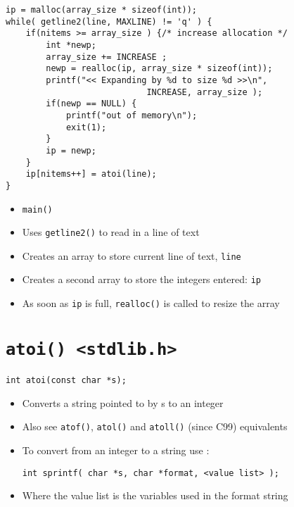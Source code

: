 \documentclass{article}
\begin{document}
\begin{verbatim}
ip = malloc(array_size * sizeof(int));
while( getline2(line, MAXLINE) != 'q' ) {
    if(nitems >= array_size ) {/* increase allocation */
        int *newp;
        array_size += INCREASE ;
        newp = realloc(ip, array_size * sizeof(int));
        printf("<< Expanding by %d to size %d >>\n",
                            INCREASE, array_size );
        if(newp == NULL) {
            printf("out of memory\n");
            exit(1);
        }
        ip = newp;
    }
    ip[nitems++] = atoi(line);
}
\end{verbatim}

\begin{itemize}
\item \verb!main()!

\item Uses \verb!getline2()! to read in a line of text

\item Creates an array to store current line of text,  \verb!line!

\item Creates a second array to store the integers entered: \verb!ip!

\item As soon as \verb!ip! is full, \verb!realloc()! is called to resize the array
\end{itemize}



\section{\texttt{atoi() <stdlib.h>}}
\begin{verbatim}
int atoi(const char *s);
\end{verbatim}

\begin{itemize}
\item Converts a string pointed to by  s  to an integer

\item Also see \verb!atof()!, \verb!atol()! and \verb!atoll()! (since C99) equivalents

\item To convert from an integer to a string use :

\begin{verbatim}
int sprintf( char *s, char *format, <value list> );
\end{verbatim}

\item Where the value list is the variables used in the format string
\end{itemize}
\end{document}
